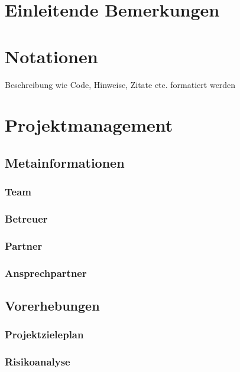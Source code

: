 \def \currentAuthor {Das Projektteam} %

\chapter*{Einleitende Bemerkungen}

\chapter*{Notationen}
Beschreibung wie Code, Hinweise, Zitate etc. formatiert werden  


\chapter{Projektmanagement}
\section{Metainformationen}
\subsection{Team}
\subsection{Betreuer}
\subsection{Partner}
\subsection{Ansprechpartner}
\section{Vorerhebungen}
\subsection{Projektzieleplan}


\newpage

\subsection{Risikoanalyse}
